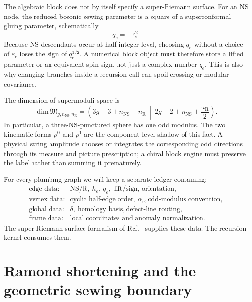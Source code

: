 \documentclass[11pt]{article}
\newcommand{\NS}{\mathrm{NS}}
\newcommand{\R}{\mathrm{R}}
\begin{document}
The algebraic block does not by itself specify a super-Riemann surface.  For
an NS node, the reduced bosonic sewing parameter is a square of a
superconformal gluing parameter, schematically
\begin{equation}
 q_e=-\varepsilon_e^2.
 \label{eq:ns-plumbing}
\end{equation}
Because NS descendants occur at half-integer level, choosing $q_e$ without a
choice of $\varepsilon_e$ loses the sign of $q_e^{1/2}$.  A numerical block
object must therefore store a lifted parameter or an equivalent spin sign,
not just a complex number $q_e$.  This is also why changing branches inside a
recursion call can spoil crossing or modular covariance.

The dimension of supermoduli space is
\begin{equation}
 \dim\mathfrak M_{g,n_{\NS},n_{\R}}
 =\left(3g-3+n_{\NS}+n_{\R}\ \middle|\
 2g-2+n_{\NS}+\frac{n_{\R}}2\right).
 \label{eq:supermoduli-dimension}
\end{equation}
In particular, a three-NS-punctured sphere has one odd modulus.  The two
kinematic forms $\rho^0$ and $\rho^1$ are the component-level shadow of this
fact.  A physical string amplitude chooses or integrates the corresponding
odd directions through its measure and picture prescription; a chiral block
engine must preserve the label rather than summing it prematurely.

For every plumbing graph we will keep a separate ledger containing:
\begin{equation}
 \boxed{
 \begin{array}{ll}
 \text{edge data:}& \NS/\R,\ h_e,\ q_e,\text{ lift/sign, orientation},\\
 \text{vertex data:}& \text{cyclic half-edge order},\ \alpha_v,
                         \text{odd-modulus convention},\\
 \text{global data:}& \delta,\ \text{homology basis},
                         \text{defect-line routing},\\
 \text{frame data:}& \text{local coordinates and anomaly normalization}.
 \end{array}}
 \label{eq:sewing-ledger}
\end{equation}
The super-Riemann-surface formalism of
Ref.~\cite{Witten2012SuperRiemannSurfaces} supplies these data.  The recursion
kernel consumes them.

\section{Ramond shortening and the geometric sewing boundary}
\label{sec:ramond}
\end{document}
